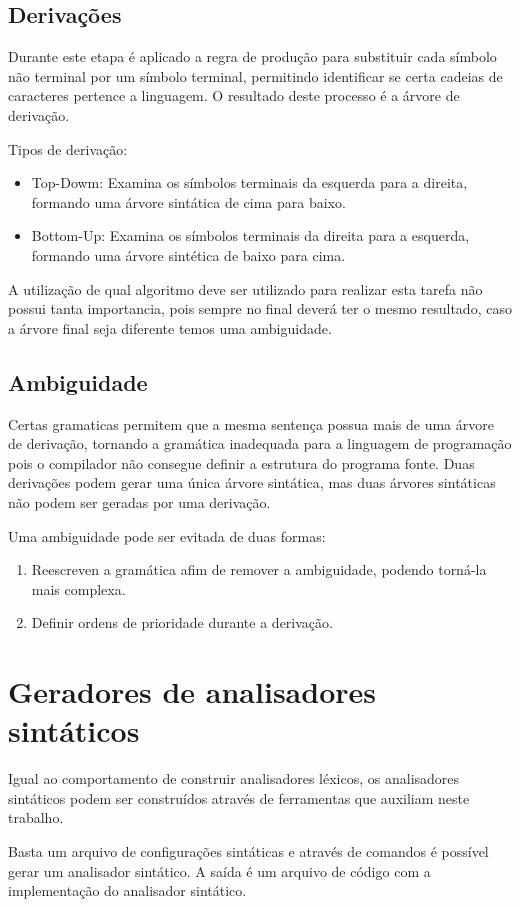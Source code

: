 \subsection{Derivações}

Durante este etapa é aplicado a regra de produção para substituir cada símbolo não terminal por um símbolo terminal,
permitindo identificar se certa cadeias de caracteres pertence a linguagem.
O resultado deste processo é a árvore de derivação.

Tipos de derivação:

\begin{itemize}
  \item Top-Dowm: Examina os símbolos terminais da esquerda para a direita, formando uma árvore sintática de cima para baixo.
  \item Bottom-Up: Examina os símbolos terminais da direita para a esquerda, formando uma árvore sintética de baixo para cima.
\end{itemize}

A utilização de qual algoritmo deve ser utilizado para realizar esta tarefa não possui tanta importancia,
pois sempre no final deverá ter o mesmo resultado,
caso a árvore final seja diferente temos uma ambiguidade.

\subsection{Ambiguidade}

Certas gramaticas permitem que a mesma sentença possua mais de uma árvore de derivação,
tornando a gramática inadequada para a linguagem de programação pois o compilador não consegue definir a estrutura do programa fonte.
Duas derivações podem gerar uma única árvore sintática, mas duas árvores sintáticas não podem ser geradas por uma derivação.

Uma ambiguidade pode ser evitada de duas formas:

\begin{enumerate}
  \item Reescreven a gramática afim de remover a ambiguidade, podendo torná-la mais complexa.
  \item Definir ordens de prioridade durante a derivação.
\end{enumerate}

\section{Geradores de analisadores sintáticos}

Igual ao comportamento de construir analisadores léxicos, os analisadores sintáticos podem ser construídos através de ferramentas que auxiliam neste trabalho.

Basta um arquivo de configurações sintáticas e através de comandos é possível gerar um analisador sintático.
A saída é um arquivo de código com a implementação do analisador sintático.
